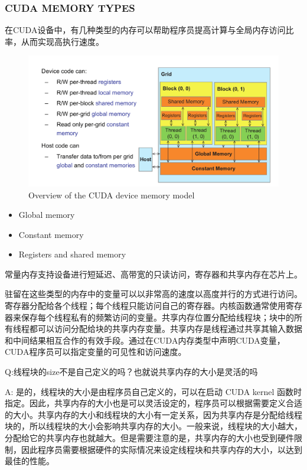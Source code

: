 \documentclass[11pt]{ctexart}
\begin{document}
\subsubsection{CUDA MEMORY TYPES}

在CUDA设备中，有几种类型的内存可以帮助程序员提高计算与全局内存访问比率，从而实现高执行速度。

\begin{figure}[ht]
	\centering
	\includegraphics[width=1.0\textwidth]{images/OverviewoftheCUDAdevicememorymodel.png}
	\caption{Overview of the CUDA device memory model}
	\label{fig:1}
\end{figure}


\begin{itemize}
	\item  Global memory
	\item  Constant memory
	\item  Registers and shared memory
\end{itemize}

常量内存支持设备进行短延迟、高带宽的只读访问，寄存器和共享内存在芯片上。

驻留在这些类型的内存中的变量可以以非常高的速度以高度并行的方式进行访问。寄存器分配给各个线程；每个线程只能访问自己的寄存器。内核函数通常使用寄存器来保存每个线程私有的频繁访问的变量。共享内存位置分配给线程块；块中的所有线程都可以访问分配给块的共享内存变量。共享内存是线程通过共享其输入数据和中间结果相互合作的有效手段。通过在CUDA内存类型中声明CUDA变量，CUDA程序员可以指定变量的可见性和访问速度。

Q:线程块的size不是自己定义的吗？也就说共享内存的大小是灵活的吗

A: 是的，线程块的大小是由程序员自己定义的，可以在启动 CUDA kernel 函数时指定。因此，共享内存的大小也是可以灵活设定的，程序员可以根据需要定义合适的大小。共享内存的大小和线程块的大小有一定关系，因为共享内存是分配给线程块的，所以线程块的大小会影响共享内存的大小。一般来说，线程块的大小越大，分配给它的共享内存也就越大。但是需要注意的是，共享内存的大小也受到硬件限制，因此程序员需要根据硬件的实际情况来设定线程块和共享内存的大小，以达到最佳的性能。
\end{document}
